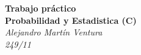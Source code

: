 \documentclass[12pt, a4paper,english,spanish]{amsart}
\begin{document}
\begin{center}
   \Large\textbf{Trabajo práctico}\\
   \Large\textbf{Probabilidad y Estadistica (C)}\\
   \large\textit{Alejandro Martín Ventura}\\
   \large\textit{249/11}
\end{center}




\newpage

\newpage


\newpage

\newpage

\newpage

\end{document}
